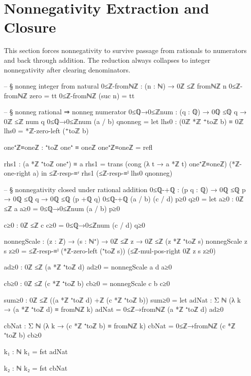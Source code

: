 \documentclass[11pt,a4paper]{book}
\begin{document}
\section{Nonnegativity Extraction and Closure}

This section forces nonnegativity to survive passage from rationals to
numerators and back through addition.  The reduction always collapses to
integer nonnegativity after clearing denominators.

\begin{code}
-- § nonneg integer from natural
0≤ℤ-fromℕℤ : (n : ℕ) → 0ℤ ≤ℤ fromℕℤ n
0≤ℤ-fromℕℤ zero = tt
0≤ℤ-fromℕℤ (suc n) = tt

-- § nonneg rational ⇒ nonneg numerator
0≤ℚ→0≤ℤnum : (q : ℚ) → 0ℚ ≤ℚ q → 0ℤ ≤ℤ num q
0≤ℚ→0≤ℤnum (a / b) qnonneg =
  let
    lhs0 : (0ℤ *ℤ ⁺toℤ b) ≡ 0ℤ
    lhs0 = *ℤ-zero-left (⁺toℤ b)

    one⁺ℤ≡oneℤ : ⁺toℤ one⁺ ≡ oneℤ
    one⁺ℤ≡oneℤ = refl

    rhs1 : (a *ℤ ⁺toℤ one⁺) ≡ a
    rhs1 = trans (cong (λ t → a *ℤ t) one⁺ℤ≡oneℤ) (*ℤ-one-right a)
  in
  ≤ℤ-resp-≡ʳ rhs1 (≤ℤ-resp-≡ˡ lhs0 qnonneg)

-- § nonnegativity closed under rational addition
0≤ℚ-+ℚ : (p q : ℚ) → 0ℚ ≤ℚ p → 0ℚ ≤ℚ q → 0ℚ ≤ℚ (p +ℚ q)
0≤ℚ-+ℚ (a / b) (c / d) p≥0 q≥0 =
  let
    a≥0 : 0ℤ ≤ℤ a
    a≥0 = 0≤ℚ→0≤ℤnum (a / b) p≥0

    c≥0 : 0ℤ ≤ℤ c
    c≥0 = 0≤ℚ→0≤ℤnum (c / d) q≥0

    nonnegScale : (z : ℤ) → (s : ℕ⁺) → 0ℤ ≤ℤ z → 0ℤ ≤ℤ (z *ℤ ⁺toℤ s)
    nonnegScale z s z≥0 =
      ≤ℤ-resp-≡ˡ (*ℤ-zero-left (⁺toℤ s))
        (≤ℤ-mul-pos-right 0ℤ z s z≥0)

    ad≥0 : 0ℤ ≤ℤ (a *ℤ ⁺toℤ d)
    ad≥0 = nonnegScale a d a≥0

    cb≥0 : 0ℤ ≤ℤ (c *ℤ ⁺toℤ b)
    cb≥0 = nonnegScale c b c≥0

    sum≥0 : 0ℤ ≤ℤ ((a *ℤ ⁺toℤ d) +ℤ (c *ℤ ⁺toℤ b))
    sum≥0 =
      let
        adNat : Σ ℕ (λ k → (a *ℤ ⁺toℤ d) ≡ fromℕℤ k)
        adNat = 0≤ℤ→fromℕℤ (a *ℤ ⁺toℤ d) ad≥0

        cbNat : Σ ℕ (λ k → (c *ℤ ⁺toℤ b) ≡ fromℕℤ k)
        cbNat = 0≤ℤ→fromℕℤ (c *ℤ ⁺toℤ b) cb≥0

        k₁ : ℕ
        k₁ = fst adNat

        k₂ : ℕ
        k₂ = fst cbNat


\end{code}
\end{document}
